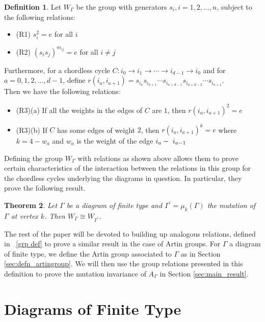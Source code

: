 \documentclass[11pt]{amsart}
\newtheorem{thm}{Theorem}[section]
\theoremstyle{definition}
\newtheorem{defn}[thm]{Definition}
\begin{document}
\begin{defn}
Let $W_{\Gamma}$ be the group with generators $s_i, i = 1,2,\ldots, n$, subject to the following relations:
\begin{itemize}
\item{(R1)} $s_i^2 = e$ for all $i$
\item{(R2)} $\left(s_is_j\right)^{m_{ij}} = e$ for all $i \neq j$
\end{itemize}
Furthermore, for a chordless cycle $C : i_0 \rightarrow i_1 \rightarrow \cdots \rightarrow i_{d-1} \rightarrow i_0$ and for $a = 0,1,2,\ldots, d-1$, define \textbf{$r\left(i_a, i_{a+1}\right) = s_{i_a}s_{i_{a+1}} \cdots s_{i_{a+d-1}}s_{i_{a+d-2}} \cdots s_{i_{a+1}}$}.\\

\vspace{0.1cm}
Then we have the following relations:
\begin{itemize}
\item{(R3)(a)} If all the weights in the edges of $C$ are $1$, then $r(i_a, i_{a+1})^2 = e$
\item{(R3)(b)} If $C$ has some edges of weight $2$, then $r(i_a, i_{a+1})^k = e$ where $k = 4-w_a$ and $w_a$ is the weight of the edge $i_a\--\ i_{a-1}$
\end{itemize}
\end{defn}

Defining the group $W_{\Gamma}$ with relations as shown above allows them to prove certain characteristics of the interaction between the relations in this group for the chordless cycles underlying the diagrams in question. In particular, they prove the following result.
\begin{thm}\cite[Theorem 5.4a]{BM13}
Let $\Gamma$ be a diagram of finite type and $\Gamma^{\prime} = \mu_k(\Gamma)$ the mutation of $\Gamma$ at vertex $k$. Then $W_{\Gamma} \cong W_{\Gamma^{\prime}}$.
\end{thm}

The rest of the paper will be devoted to building up analogous relations, defined in ~\ref{grp def} to prove a similar result in the case of Artin groups. For $\Gamma$ a diagram of finite type, we define the Artin group associated to $\Gamma$ as in Section \ref{sec:defn_artingroup}. We will then use the group relations presented in this definition to prove the mutation invariance of $A_{\Gamma}$ in Section \ref{sec:main_result}.

\section{Diagrams of Finite Type}
\label{sec:finite-type_diagrams}
\end{document}
